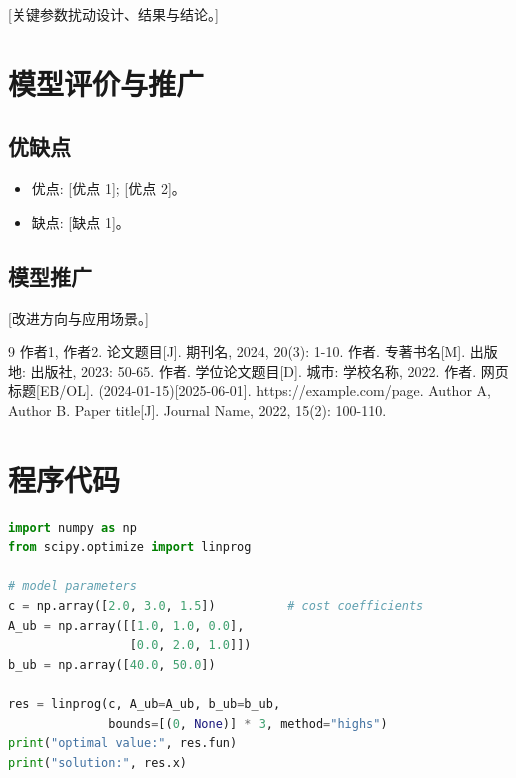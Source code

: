 \documentclass[zihao=-4,a4paper]{ctexart}
\begin{document}
[关键参数扰动设计、结果与结论。]

\section{模型评价与推广}

\subsection{优缺点}

\begin{itemize}
  \item 优点: [优点 1]; [优点 2]。
  \item 缺点: [缺点 1]。
\end{itemize}

\subsection{模型推广}

[改进方向与应用场景。]


\begin{thebibliography}{9}
   作者1, 作者2. 论文题目[J]. 期刊名, 2024, 20(3): 1-10.
   作者. 专著书名[M]. 出版地: 出版社, 2023: 50-65.
   作者. 学位论文题目[D]. 城市: 学校名称, 2022.
   作者. 网页标题[EB/OL]. (2024-01-15)[2025-06-01]. https://example.com/page.
   Author A, Author B. Paper title[J]. Journal Name, 2022, 15(2): 100-110.
\end{thebibliography}

\appendix

\section{程序代码}

\begin{lstlisting}[language=Python, caption={求解脚本示例 solve.py}]
import numpy as np
from scipy.optimize import linprog

# model parameters
c = np.array([2.0, 3.0, 1.5])          # cost coefficients
A_ub = np.array([[1.0, 1.0, 0.0],
                 [0.0, 2.0, 1.0]])
b_ub = np.array([40.0, 50.0])

res = linprog(c, A_ub=A_ub, b_ub=b_ub,
              bounds=[(0, None)] * 3, method="highs")
print("optimal value:", res.fun)
print("solution:", res.x)
\end{lstlisting}
\end{document}
